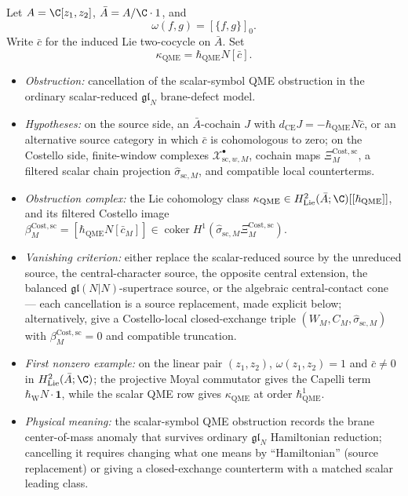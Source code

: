 \documentclass[11pt]{memoir}
\begin{document}
\begin{thm}
\label{thm:scalar-qme-alternatives}
  Let \(A=\C[z_1,z_2]\), \(\bar A=A/\C\cdot1\), and
  \[
    \omega(f,g)=[\{f,g\}]_0 .
  \]
  Write \(\bar c\) for the induced Lie two-cocycle on \(\bar A\).  Set
  \[
    \kappa_{\mathrm{QME}}
      =\hbar_{\mathrm{QME}}N[\bar c].
  \]
  \begin{itemize}
    \item \emph{Obstruction:} cancellation of the scalar-symbol
      QME obstruction in the ordinary scalar-reduced
      \(\mathfrak{gl}_N\) brane-defect model.
    \item \emph{Hypotheses:} on the source side, an
      \(\bar A\)-cochain \(J\) with
      \(d_{\mathrm{CE}}J=-\hbar_{\mathrm{QME}}N\bar c\),
      or an alternative source category in which \(\bar c\) is
      cohomologous to zero; on the Costello side, finite-window
      complexes \(\mathcal X^\bullet_{\mathrm{sc},w,M}\), cochain
      maps \(\Xi^{\mathrm{Cost},\mathrm{sc}}_M\), a filtered scalar
      chain projection \(\widehat\sigma_{\mathrm{sc},M}\), and
      compatible local counterterms.
    \item \emph{Obstruction complex:} the Lie cohomology class
      \(\kappa_{\mathrm{QME}}\in
      H^2_{\mathrm{Lie}}(\bar A;\C)[[\hbar_{\mathrm{QME}}]]\),
      and its filtered Costello image
      \(\beta_M^{\mathrm{Cost},\mathrm{sc}}=
      [\hbar_{\mathrm{QME}}N[\bar c_M]]\in
      \operatorname{coker}H^1(\widehat\sigma_{\mathrm{sc},M}
      \Xi^{\mathrm{Cost},\mathrm{sc}}_M)\).
    \item \emph{Vanishing criterion:} either replace the scalar-reduced
      source by the unreduced source, the central-character source,
      the opposite central extension, the balanced
      \(\mathfrak{gl}(N|N)\)-supertrace source, or the algebraic
      central-contact cone --- each cancellation is a source
      replacement, made explicit below; alternatively, give a
      Costello-local closed-exchange triple
      \((W_M,C_M,\widehat\sigma_{\mathrm{sc},M})\) with
      \(\beta_M^{\mathrm{Cost},\mathrm{sc}}=0\) and compatible
      truncation.
    \item \emph{First nonzero example:} on the linear pair
      \((z_1,z_2)\), \(\omega(z_1,z_2)=1\) and \(\bar c\ne0\) in
      \(H^2_{\mathrm{Lie}}(\bar A;\C)\); the projective Moyal
      commutator gives the Capelli term
      \(\hbar_{\mathrm{W}}N\cdot\mathbf 1\), while the scalar QME
      row gives \(\kappa_{\mathrm{QME}}\) at order
      \(\hbar_{\mathrm{QME}}^1\).
    \item \emph{Physical meaning:} the scalar-symbol QME obstruction
      records the brane center-of-mass anomaly that survives ordinary
      \(\mathfrak{gl}_N\) Hamiltonian reduction; cancelling it
      requires changing what one means by ``Hamiltonian'' (source
      replacement) or giving a closed-exchange counterterm with a
      matched scalar leading class.
  \end{itemize}


\end{thm}
\end{document}
